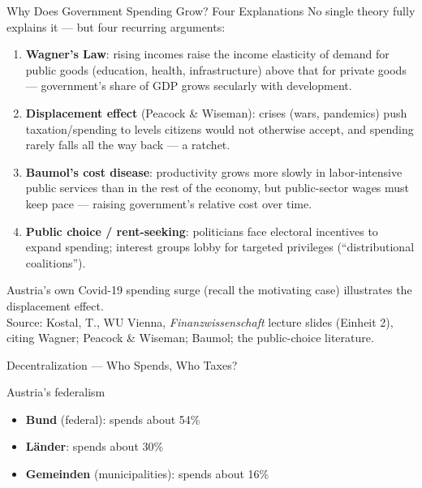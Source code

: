 \documentclass[11pt,aspectratio=169]{beamer}
\newcommand{\srcnote}[1]{{\footnotesize\color{wugray}Source: #1}}
\begin{document}
\begin{frame}{Why Does Government Spending Grow? Four Explanations}
  \footnotesize
  No single theory fully explains it --- but four recurring arguments:
  \begin{enumerate}
    \setlength{\itemsep}{2pt}
    \item \textbf{Wagner's Law}: rising incomes raise the income elasticity of demand for public goods (education, health, infrastructure) above that for private goods --- government's share of GDP grows secularly with development.
    \item \textbf{Displacement effect} (Peacock \& Wiseman): crises (wars, pandemics) push taxation/spending to levels citizens would not otherwise accept, and spending rarely falls all the way back --- a ratchet.
    \item \textbf{Baumol's cost disease}: productivity grows more slowly in labor-intensive public services than in the rest of the economy, but public-sector wages must keep pace --- raising government's relative cost over time.
    \item \textbf{Public choice / rent-seeking}: politicians face electoral incentives to expand spending; interest groups lobby for targeted privileges (``distributional coalitions'').
  \end{enumerate}
  \centering
  Austria's own Covid-19 spending surge (recall the motivating case) illustrates the displacement effect.\\
  \srcnote{Kostal, T., WU Vienna, \emph{Finanzwissenschaft} lecture slides (Einheit 2), citing Wagner; Peacock \& Wiseman; Baumol; the public-choice literature.}
\end{frame}

\begin{frame}{Decentralization --- Who Spends, Who Taxes?}
  \vspace{1em}
  \begin{alertblock}{Austria's federalism}
    \begin{itemize}
      \item \textbf{Bund} (federal): spends about 54\%
      \item \textbf{Länder}: spends about 30\%
      \item \textbf{Gemeinden} (municipalities): spends about 16\%
    \end{itemize}
  \end{alertblock}
  \centering \small

\end{frame}
\end{document}
